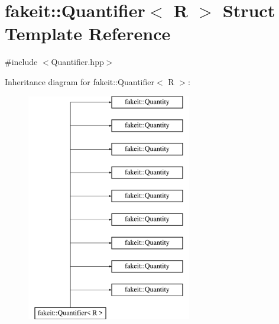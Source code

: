 \hypertarget{structfakeit_1_1Quantifier}{}\section{fakeit\+::Quantifier$<$ R $>$ Struct Template Reference}
\label{structfakeit_1_1Quantifier}


{\ttfamily \#include $<$Quantifier.\+hpp$>$}

Inheritance diagram for fakeit\+::Quantifier$<$ R $>$\+:\begin{figure}[H]
\begin{center}
\leavevmode
\includegraphics[height=10.000000cm]{structfakeit_1_1Quantifier}
\end{center}
\end{figure}
